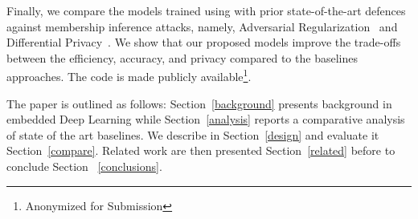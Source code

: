 Finally, we compare the models trained using \method\hspace{0.02in} with prior state-of-the-art defences against membership inference attacks, namely, Adversarial Regularization~\cite{DBLP:conf/ccs/NasrSH18} and Differential Privacy~\cite{Abadi:2016:DLD:2976749.2978318}.
We show that our proposed models improve the trade-offs between the efficiency,  accuracy, and privacy compared to the baselines approaches. The code is made publicly available\footnote{Anonymized for Submission}.

The paper is outlined as follows: Section~\ref{background} presents background in embedded Deep Learning while Section~\ref{analysis} reports a comparative analysis of state of the art baselines.
We describe \method\hspace{0.02in} in Section~\ref{design} and evaluate it Section~\ref{compare}. Related work are then presented Section~\ref{related} before to conclude Section ~\ref{conclusions}.

